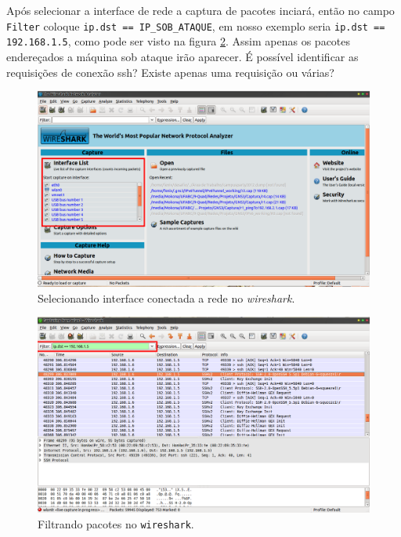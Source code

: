\documentclass[12pt]{abnt}
\begin{document}
Após selecionar a interface de rede a captura de pacotes inciará, então no campo \texttt{Filter} coloque \texttt{ip.dst == IP\_SOB\_ATAQUE},
em nosso exemplo seria \texttt{ip.dst == 192.168.1.5}, como pode ser visto na figura \ref{captura}. Assim apenas os pacotes endereçados
a máquina sob ataque irão aparecer. É possível identificar as requisições de conexão ssh? Existe apenas uma requisição ou várias?

\begin{figure}[!hbt]
  \centering
  \includegraphics[scale=0.3]{Wireshark-s}
  \caption[Wireshark-s]{Selecionando interface conectada a rede no \textit{wireshark}.}
  \label{wireshark}
\end{figure}

\begin{figure}[!hbt]
  \centering
  \includegraphics[scale=0.3]{Wireshark-cap}
  \caption[Wireshark-cap]{Filtrando pacotes no \texttt{wireshark}.}
  \label{captura}
\end{figure}
\end{document}
